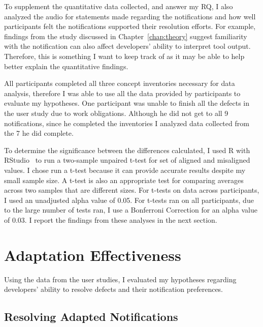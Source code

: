 To supplement the quantitative data collected, and answer my RQ, I also analyzed the audio for statements made regarding the notifications and how well participants felt the notifications supported their resolution efforts.
For example, findings from the study discussed in Chapter~\ref{chap:theory} suggest familiarity with the notification can also affect developers' ability to interpret tool output. Therefore, this is something I want to keep track of as it may be able to help better explain the quantitative findings.

All participants completed all three concept inventories necessary for data analysis, therefore I was able to use all the data provided by participants to evaluate my hypotheses.
One participant was unable to finish all the defects in the user study due to work obligations. Although he did not get to all 9 notifications, since he completed the inventories I analyzed data collected from the 7 he did complete.

To determine the significance between the differences calculated, I used R with RStudio~\cite{RSoftware} to run a two-sample unpaired t-test for set of aligned and misaligned values. I chose run a t-test because it can provide accurate results despite my small sample size. A t-test is also an  appropriate test for comparing averages across two samples that are different sizes.
For t-tests on data across participants, I used an unadjusted alpha value of 0.05. 
For t-tests ran on all participants, due to the large number of tests ran, I use a Bonferroni Correction for an alpha value of 0.03.
I report the findings from these analyses in the next section.

\section{Adaptation Effectiveness}
Using the data from the user studies, I evaluated my hypotheses regarding developers' ability to resolve defects and their notification preferences.

\subsection{Resolving Adapted Notifications}

